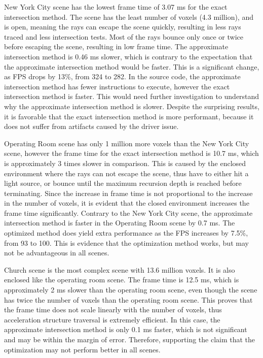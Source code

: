 \documentclass[12pt]{article}
\begin{document}
New York City scene has the lowest frame time of 3.07 ms for the exact intersection method.
The scene has the least number of voxels (4.3 million), and is open, meaning the rays can escape the scene quickly, resulting in less rays traced and less intersection tests.
Most of the rays bounce only once or twice before escaping the scene, resulting in low frame time.
The approximate intersection method is 0.46 ms slower, which is contrary to the expectation that the approximate intersection method would be faster.
This is a significant change, as FPS drops by 13\%, from 324 to 282.
In the source code, the approximate intersection method has fewer instructions to execute, however the exact intersection method is faster.
This would need further investigation to understand why the approximate intersection method is slower.
Despite the surprising results, it is favorable that the exact intersection method is more performant, because it does not suffer from artifacts caused by the driver issue.

Operating Room scene has only 1 million more voxels than the New York City scene, however the frame time for the exact intersection method is 10.7 ms, which is approximately 3 times slower in comparison.
This is caused by the enclosed environment where the rays can not escape the scene, thus have to either hit a light source, or bounce until the maximum recursion depth is reached before terminating.
Since the increase in frame time is not proportional to the increase in the number of voxels, it is evident that the closed environment increases the frame time significantly.
Contrary to the New York City scene, the approximate intersection method is faster in the Operating Room scene by 0.7 ms.
The optimized method does yield extra performance as the FPS increases by 7.5\%, from 93 to 100.
This is evidence that the optimization method works, but may not be advantageous in all scenes.

Church scene is the most complex scene with 13.6 million voxels. It is also enclosed like the operating room scene.
The frame time is 12.5 ms, which is approximately 2 ms slower than the operating room scene, even though the scene has twice the number of voxels than the operating room scene.
This proves that the frame time does not scale linearly with the number of voxels, thus acceleration structure traversal is extremely efficient.
In this case, the approximate intersection method is only 0.1 ms faster, which is not significant and may be within the margin of error.
Therefore, supporting the claim that the optimization may not perform better in all scenes.
\end{document}
